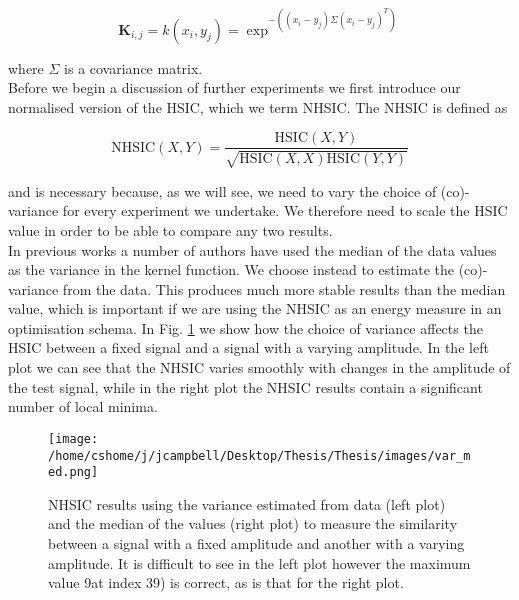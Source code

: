 \begin{equation}
\textbf{K}_{i,j} = k(x_i,y_j) = \exp^{-((x_i-y_j)\Sigma(x_i-y_j)^T)}
\end{equation}

\noindent where $\Sigma$ is a covariance matrix.\\

Before we begin a discussion of further experiments we first introduce our normalised version of the HSIC, which we term NHSIC. The NHSIC is defined as 

\begin{equation}
\text{NHSIC}(X,Y) = \frac{\text{HSIC}(X,Y)}{\sqrt{\text{HSIC}(X,X)\text{HSIC}(Y,Y)}}
\end{equation}

\noindent and is necessary because, as we will see, we need to vary the choice of (co)-variance for every experiment we undertake. We therefore need to scale the HSIC value in order to be able to compare any two results. \\

In previous works a number of authors have used the median of the data values as the variance in the kernel function. We choose instead to estimate the (co)-variance from the data. This produces much more stable results than the median value, which is important if we are using the NHSIC as an energy measure in an optimisation schema. In Fig. \ref{var_med} we show how the choice of variance affects the HSIC between a fixed signal and a signal with a varying amplitude. In the left plot we can see that the NHSIC varies smoothly with changes in the amplitude of the test signal, while in the right plot the NHSIC results contain a significant number of local minima.\\

\begin{figure}[h]
\texttt{[image: /home/cshome/j/jcampbell/Desktop/Thesis/Thesis/images/var\_med.png]}
\caption{NHSIC results using the variance estimated from data (left plot) and the median of the values (right plot) to measure the similarity between a signal with a fixed amplitude and another with a varying amplitude. It is difficult to see in the left plot however the maximum value 9at index 39) is correct, as is that for the right plot.  \label{var_med}}
\end{figure}

